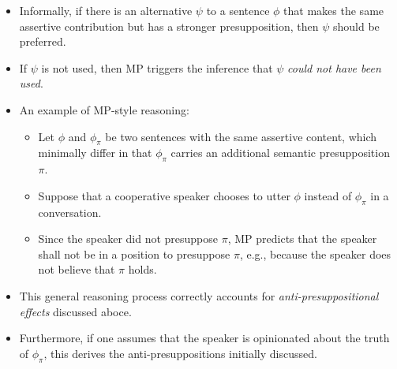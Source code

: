 \documentclass[landscape,twocolumn,cronos,paper=letter]{ling-handout}
\begin{document}
\begin{itemize}
        \begin{tcolorbox}
          \textsc{Maximize Presupposition} (MP)
          \tcblower
          If the following is true for any $\psi \in \ml{alt} ϕ$, then the
          sentence $ϕ$ cannot be felicitously uttered in context $C$:
          \begin{itemize}
          \item $ψ$'s presupposition \textit{asymmetrically entails} $ϕ$'s
          presupposition, and
          \item $ϕ$ and $ψ$ are contextually equivalent.
              \end{itemize}
        \end{tcolorbox}

        \item Informally, if there is an alternative $\psi$ to a sentence $\phi$
        that makes the same assertive contribution but has a stronger
        presupposition, then $\psi$ should be preferred.

        \item If $\psi$ is not used, then MP triggers the inference that $\psi$
        \textit{could not have been used}.

      \item An example of MP-style reasoning:

        \begin{itemize}

            \item Let $ϕ$ and $\phi_{\pi}$ be two sentences with the same
            assertive content, which minimally differ in that $\phi_{\pi}$
            carries an additional semantic presupposition $\pi$.

            \item Suppose that a cooperative speaker chooses to utter $\phi$
            instead of $\phi_{\pi}$ in a conversation.

            \item Since the speaker did not presuppose $\pi$, MP predicts that
            the speaker shall not be in a position to presuppose $\pi$, e.g.,
            because the speaker does not believe that $\pi$ holds.

        \end{itemize}

     \item This general reasoning process correctly accounts for
        \textit{anti-presuppositional effects} discussed aboce.

      \item Furthermore, if one assumes that the speaker is opinionated about
        the truth of $\phi_{\pi}$, this derives the anti-presuppositions
        initially discussed.

    \end{itemize}
\end{document}
